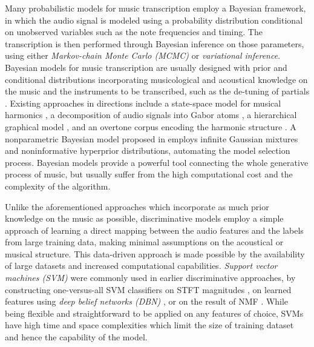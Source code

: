 
Many probabilistic models for music transcription employ a Bayesian framework, in which the audio signal is modeled using a probability distribution conditional on unobserved variables such as the note frequencies and timing.
The transcription is then performed through Bayesian inference on those parameters, using either \textit{Markov-chain Monte Carlo (MCMC)} or \textit{variational inference}.
Bayesian models for music transcription are usually designed with prior and conditional distributions incorporating musicological and acoustical knowledge on the music and the instruments to be transcribed, such as the de-tuning of partials \cite{davy2003harmonic}.
Existing approaches in directions include
a state-space model for musical harmonics \cite{cemgil2003generative},
a decomposition of audio signals into Gabor atoms \cite{davy2006bayesian}, 
a hierarchical graphical model \cite{pesek2017hierarchical},
and an overtone corpus encoding the harmonic structure \cite{sakaue2013overtone}.
A nonparametric Bayesian model proposed in \cite{yoshii2012nonparametric} employs infinite Gaussian mixtures and noninformative hyperprior distributions, automating the model selection process.
Bayesian models provide a powerful tool connecting the whole generative process of music, but usually suffer from the high computational cost and the complexity of the algorithm.



Unlike the aforementioned approaches which incorporate as much prior knowledge on the music as possible, discriminative models employ a simple approach of learning a direct mapping between the audio features and the labels from large training data, making minimal assumptions on the acoustical or musical structure.
This data-driven approach is made possible by the availability of large datasets and increased computational capabilities.
\textit{Support vector machines (SVM)} were commonly used in earlier discriminative approaches, by constructing one-versus-all SVM classifiers on STFT magnitudes \cite{poliner2006discriminative}, on learned features using \textit{deep belief networks (DBN)} \cite{nam2011classification}, or on the result of NMF \cite{weninger2013nmf}.
While being flexible and straightforward to be applied on any features of choice, SVMs have high time and space complexities which limit the size of training dataset and hence the capability of the model.


